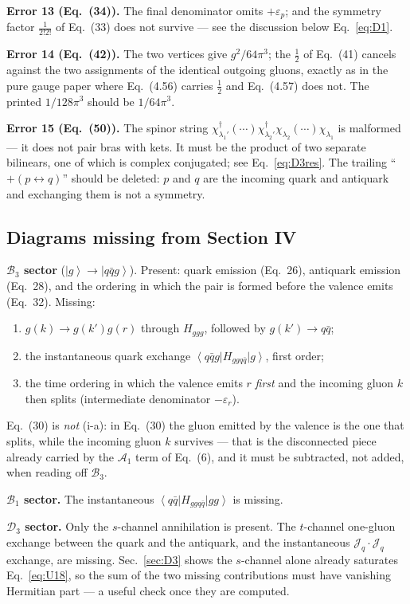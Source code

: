 \documentclass[11pt]{article}
\newcommand{\eps}{\varepsilon}
\newcommand{\dg}{\dagger}
\newcommand{\ket}[1]{\left|#1\right\rangle}
\newcommand{\bra}[1]{\left\langle#1\right|}
\begin{document}
\begin{err}
\textbf{Error 13 (Eq.~(34)).} The final denominator omits $+\eps_{p}$; and the symmetry factor
$\tfrac{1}{2!2!}$ of Eq.~(33) does not survive --- see the discussion below Eq.~\eqref{eq:D1}.

\textbf{Error 14 (Eq.~(42)).} The two vertices give $g^{2}/64\pi^{3}$; the $\tfrac12$ of Eq.~(41)
cancels against the two assignments of the identical outgoing gluons, exactly as in the pure
gauge paper where Eq.~(4.56) carries $\tfrac12$ and Eq.~(4.57) does not. The printed
$1/128\pi^{3}$ should be $1/64\pi^{3}$.

\textbf{Error 15 (Eq.~(50)).} The spinor string
$\chi^{\dg}_{\lambda_1'}(\cdots)\chi^{\dg}_{\lambda_2'}\chi_{\lambda_2}(\cdots)\chi_{\lambda_1}$
is malformed --- it does not pair bras with kets. It must be the product of two separate
bilinears, one of which is complex conjugated; see Eq.~\eqref{eq:D3res}. The trailing
``$+(p\leftrightarrow q)$'' should be deleted: $p$ and $q$ are the incoming quark and antiquark
and exchanging them is not a symmetry.
\end{err}

\subsection{Diagrams missing from Section IV}

\begin{note}
\textbf{$\mathcal B_3$ sector} ($\ket{g}\to\ket{q\bar q g}$). Present: quark emission (Eq.~26),
antiquark emission (Eq.~28), and the ordering in which the pair is formed before the valence
emits (Eq.~32). Missing:
\begin{enumerate}
\item[(v)] $g(k)\to g(k')g(r)$ through $H_{ggg}$, followed by $g(k')\to q\bar q$;
\item[(vi)] the instantaneous quark exchange $\bra{q\bar q g}H_{ggq\bar q}\ket{g}$, first order;
\item[(i-a)] the time ordering in which the valence emits $r$ \emph{first} and the incoming
gluon $k$ then splits (intermediate denominator $-\eps_{r}$).
\end{enumerate}
Eq.~(30) is \emph{not} (i-a): in Eq.~(30) the gluon emitted by the valence is the one that
splits, while the incoming gluon $k$ survives --- that is the disconnected piece already carried
by the $\mathcal A_1$ term of Eq.~(6), and it must be subtracted, not added, when reading off
$\mathcal B_3$.

\textbf{$\mathcal B_1$ sector.} The instantaneous $\bra{q\bar q}H_{ggq\bar q}\ket{gg}$ is missing.

\textbf{$\mathcal D_3$ sector.} Only the $s$-channel annihilation is present. The $t$-channel
one-gluon exchange between the quark and the antiquark, and the instantaneous
$\mathcal J_{q}\!\cdot\!\mathcal J_{q}$ exchange, are missing. Sec.~\ref{sec:D3} shows the
$s$-channel alone already saturates Eq.~\eqref{eq:U18}, so the sum of the two missing
contributions must have vanishing Hermitian part --- a useful check once they are computed.
\end{note}
\end{document}
